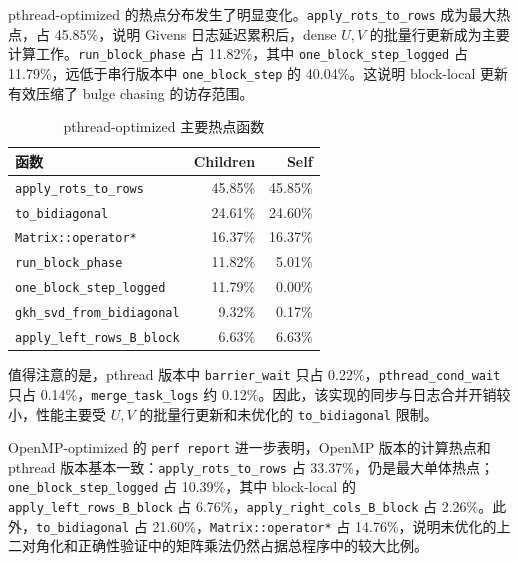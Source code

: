 ﻿\documentclass[UTF8,a4paper]{ctexart}
\begin{document}
pthread-optimized 的热点分布发生了明显变化。\texttt{apply\_rots\_to\_rows} 成为最大热点，占 45.85\%，说明 Givens 日志延迟累积后，dense $U,V$ 的批量行更新成为主要计算工作。\texttt{run\_block\_phase} 占 11.82\%，其中 \texttt{one\_block\_step\_logged} 占 11.79\%，远低于串行版本中 \texttt{one\_block\_step} 的 40.04\%。这说明 block-local 更新有效压缩了 bulge chasing 的访存范围。

\begin{table}[H]
\centering
\caption{pthread-optimized 主要热点函数}
\label{tab:perf_pthread_hotspot}
\begin{tabular}{lrr}
\toprule
函数 & Children & Self \\
\midrule
\texttt{apply\_rots\_to\_rows} & 45.85\% & 45.85\% \\
\texttt{to\_bidiagonal} & 24.61\% & 24.60\% \\
\texttt{Matrix::operator*} & 16.37\% & 16.37\% \\
\texttt{run\_block\_phase} & 11.82\% & 5.01\% \\
\texttt{one\_block\_step\_logged} & 11.79\% & 0.00\% \\
\texttt{gkh\_svd\_from\_bidiagonal} & 9.32\% & 0.17\% \\
\texttt{apply\_left\_rows\_B\_block} & 6.63\% & 6.63\% \\
\bottomrule
\end{tabular}
\end{table}

值得注意的是，pthread 版本中 \texttt{barrier\_wait} 只占 0.22\%，\texttt{pthread\_cond\_wait} 只占 0.14\%，\texttt{merge\_task\_logs} 约 0.12\%。因此，该实现的同步与日志合并开销较小，性能主要受 $U,V$ 的批量行更新和未优化的 \texttt{to\_bidiagonal} 限制。

OpenMP-optimized 的 \texttt{perf report} 进一步表明，OpenMP 版本的计算热点和 pthread 版本基本一致：\texttt{apply\_rots\_to\_rows} 占 33.37\%，仍是最大单体热点；\texttt{one\_block\_step\_logged} 占 10.39\%，其中 block-local 的 \texttt{apply\_left\_rows\_B\_block} 占 6.76\%，\texttt{apply\_right\_cols\_B\_block} 占 2.26\%。此外，\texttt{to\_bidiagonal} 占 21.60\%，\texttt{Matrix::operator*} 占 14.76\%，说明未优化的上二对角化和正确性验证中的矩阵乘法仍然占据总程序中的较大比例。
\end{document}

